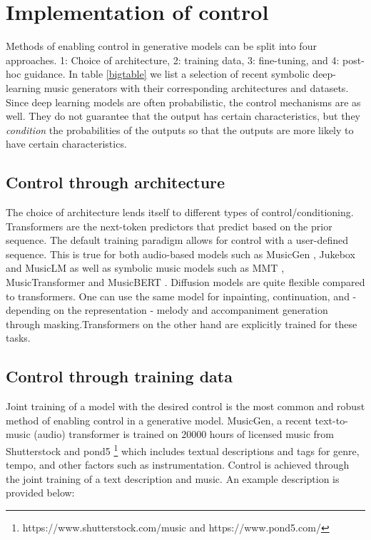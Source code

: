 \section{Implementation of control} \label{section:addingcontrol}
Methods of enabling control in generative models can be split into four approaches. 1: Choice of architecture, 2: training data, 3: fine-tuning, and 4: post-hoc guidance. In table \ref{bigtable} we list a selection of recent symbolic deep-learning music generators with their corresponding architectures and datasets. Since deep learning models are often probabilistic, the control mechanisms are as well. They do not guarantee that the output has certain characteristics, but they \textit{condition} the probabilities of the outputs so that the outputs are more likely to have certain characteristics. 

\subsection{Control through architecture}
The choice of architecture lends itself to different types of control/conditioning. Transformers are the next-token predictors that predict based on the prior sequence. The default training paradigm allows for control with a user-defined sequence. This is true for both audio-based models such as MusicGen \cite{copet2023simple}, Jukebox \cite{Dhariwal_Jun_Payne_Kim_Radford_Sutskever_2020} and MusicLM \cite{Agostinelli_Denk_Borsos_Engel_Verzetti_Caillon_Huang_Jansen_Roberts_Tagliasacchi_et_al._2023} as well as symbolic music models such as MMT \cite{Dong_Chen_MMT_Kirkpatrick_2023}, MusicTransformer \cite{Huang_Vaswani_Uszkoreit_Shazeer_Simon_Hawthorne_Dai_Hoffman_Dinculescu_Eck_2018} and MusicBERT \cite{Zeng_Tan_Wang_MUSICBERT_2021}. Diffusion models are quite flexible compared to transformers. One can use the same model for inpainting, continuation, and - depending on the representation - melody and accompaniment generation through masking.\cite{Min_Jiang_Xia_Zhao_polyffusion_2023}\cite{Rombach_Blattmann_Lorenz_Esser_Ommer_2022}Transformers on the other hand are explicitly trained for these tasks. 

\subsection{Control through training data}
Joint training of a model with the desired control is the most common and robust method of enabling control in a generative model. MusicGen\cite{copet2023simple}, a recent text-to-music (audio) transformer is trained on 20000 hours of licensed music from Shutterstock and pond5 \footnote{https://www.shutterstock.com/music and https://www.pond5.com/} which includes textual descriptions and tags for genre, tempo, and other factors such as instrumentation. Control is achieved through the joint training of a text description and music. An example description is provided below: 

